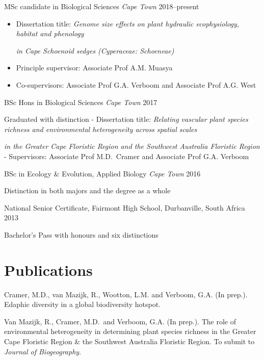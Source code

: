 \documentclass[]{article}
\providecommand{\tightlist}{%
  \setlength{\itemsep}{0pt}\setlength{\parskip}{0pt}}
\begin{document}
MSc candidate in Biological Sciences \emph{Cape Town}
\hfill 2018--present

\begin{itemize}
\tightlist
\item
  Dissertation title: \emph{Genome size effects on plant hydraulic
  ecophysiology, habitat and phenology}

  \par

  \emph{in Cape Schoenoid sedges (Cyperaceae: Schoeneae)}
\item
  Principle supervisor: Associate Prof A.M. Muasya
\item
  Co-supervisors: Associate Prof G.A. Verboom and Associate Prof A.G.
  West
\end{itemize}

BSc Hons in Biological Sciences \emph{Cape Town} \hfill 2017

\par

Graduated with distinction - Dissertation title: \emph{Relating vascular
plant species richness and environmental heterogeneity across spatial
scales}

\par

\emph{in the Greater Cape Floristic Region and the Southwest Australia
Floristic Region} - Supervisors: Associate Prof M.D.~Cramer and
Associate Prof G.A. Verboom

BSc in Ecology \& Evolution, Applied Biology \emph{Cape Town}
\hfill 2016

\par

Distinction in both majors and the degree as a whole

National Senior Certificate, Fairmont High School, Durbanville, South
Africa \hfill 2013

\par

Bachelor's Pass with honours and six distinctions

\hypertarget{publications}{%
\section{Publications}\label{publications}}

Cramer, M.D., van Mazijk, R., Wootton, L.M. and Verboom, G.A. (In
prep.). Edaphic diversity in a global biodiversity hotspot.

Van Mazijk, R., Cramer, M.D.~and Verboom, G.A. (In prep.). The role of
environmental heterogeneity in determining plant species richness in the
Greater Cape Floristic Region \& the Southwest Australia Floristic
Region. To submit to \emph{Journal of Biogeography}.
\end{document}
